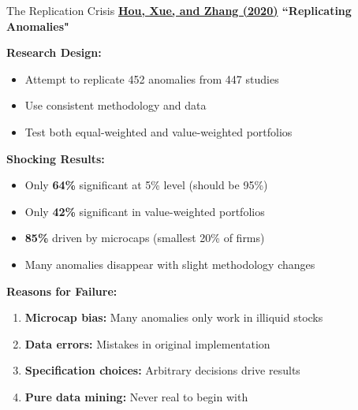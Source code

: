 \documentclass{beamer}
\begin{document}
\begin{frame}{The Replication Crisis}
    \textbf{\textcolor{blue}{\href{https://doi.org/10.1093/rfs/hhy131}{Hou, Xue, and Zhang (2020)}} ``Replicating Anomalies"}
    
    
    \textbf{Research Design:}
    \begin{itemize}
        \item Attempt to replicate 452 anomalies from 447 studies
        \item Use consistent methodology and data
        \item Test both equal-weighted and value-weighted portfolios
    \end{itemize}
    
    
    \textbf{Shocking Results:}
    \begin{itemize}
        \item Only \textbf{64\%} significant at 5\% level (should be 95\%)
        \item Only \textbf{42\%} significant in value-weighted portfolios
        \item \textbf{85\%} driven by microcaps (smallest 20\% of firms)
        \item Many anomalies disappear with slight methodology changes
    \end{itemize}
    
    
    \textbf{Reasons for Failure:}
    \begin{enumerate}
        \item \textbf{Microcap bias:} Many anomalies only work in illiquid stocks
        \item \textbf{Data errors:} Mistakes in original implementation
        \item \textbf{Specification choices:} Arbitrary decisions drive results
        \item \textbf{Pure data mining:} Never real to begin with
    \end{enumerate}
\end{frame}
\end{document}
